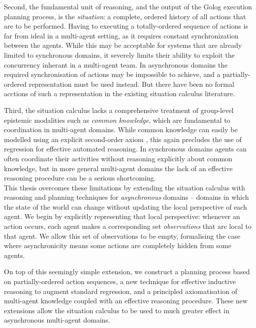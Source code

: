 Second, the fundamental unit of reasoning, and the output of the Golog
execution planning process, is the \emph{situation}: a complete, ordered
history of all actions that are to be performed. Having to executing
a totally-ordered sequence of actions is far from ideal in a multi-agent
setting, as it requires constant synchronization between the agents.
While this may be acceptable for systems that are already limited
to synchronous domains, it severely limits their ability to exploit
the concurrency inherant in a multi-agent team. In asynchronous domains
the required synchronisation of actions may be impossible to achieve,
and a partially-ordered representation must be used instead. But there
have been no formal acctions of such a representation in the existing
situation calculus literature.

Third, the situation calculus lacks a comprehensive treatment of group-level
epistemic modalities such as \emph{common knowledge}, which are fundamental
to coordination in multi-agent domains. While common knowledge can
easily be modelled using an explicit second-order axiom \citep{delgrande01sitcalc_cleudo,davis05fo_ma_theory,ghaderi07sc_joint_ability},
this again precludes the use of regression for effective automated
reasoning. In synchronous domains agents can often coordinate their
activities without reasoning explicitly about common knowledge, but
in more general multi-agent domains the lack of an effective reasoning
procedure can be a serious shortcoming.\\


This thesis overcomes these limitations by extending the situation
calculus with reasoning and planning techniques for \emph{asynchronous}
domains -- domains in which the state of the world can change without
updating the local perspective of each agent. We begin by explicitly
representing that local perspective: whenever an action occurs, each
agent makes a corresponding set \emph{observations} that are local
to that agent. We allow this set of observations to be empty, formalising
the case where asynchronicity means some actions are completely hidden
from some agents.

On top of this seemingly simple extension, we construct a planning
process based on partially-ordered action sequences, a new technique
for effective inductive reasoning to augment standard regression,
and a principled axiomatisation of multi-agent knowledge coupled with
an effective reasoning procedure. These new extensions allow the situation
calculus to be used to much greater effect in asynchronous multi-agent
domains.\newpage{}


